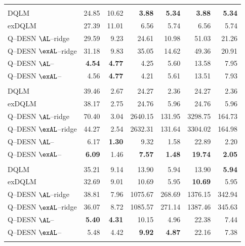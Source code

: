 \begin{longtable}{@{}lrrrrrr@{}}
\addlinespace[0.25em]
\multicolumn{7}{@{}l}{\emph{Laplace errors, $\tau = 0.50$}}\\
DQLM & 24.85 & 10.62 & \textbf{3.88} & \textbf{5.34} & \textbf{3.88} & \textbf{5.34} \\
exDQLM & 27.39 & 11.01 & 6.56 & 5.74 & 6.56 & 5.74 \\
Q--DESN \(\AL\)--ridge & 29.59 & 9.23 & 24.61 & 10.98 & 51.03 & 21.26 \\
Q--DESN \(\exAL\)--ridge & 31.18 & 9.83 & 35.05 & 14.62 & 49.36 & 20.91 \\
Q--DESN \(\AL\)--\RHS{} & \textbf{4.54} & \textbf{4.77} & 4.25 & 5.60 & 13.58 & 7.95 \\
Q--DESN \(\exAL\)--\RHS{} & 4.56 & \textbf{4.77} & 4.21 & 5.61 & 13.51 & 7.93 \\
\addlinespace[0.25em]
\multicolumn{7}{@{}l}{\emph{Gaussian mixture errors, $\tau = 0.05$}}\\
DQLM & 39.46 & 2.67 & 24.27 & 2.36 & 24.27 & 2.36 \\
exDQLM & 38.17 & 2.75 & 24.76 & 5.96 & 24.76 & 5.96 \\
Q--DESN \(\AL\)--ridge & 70.40 & 3.04 & 2640.15 & 131.95 & 3298.75 & 164.73 \\
Q--DESN \(\exAL\)--ridge & 44.27 & 2.54 & 2632.31 & 131.64 & 3304.02 & 164.98 \\
Q--DESN \(\AL\)--\RHS{} & 6.17 & \textbf{1.30} & 9.32 & 1.58 & 22.89 & 2.20 \\
Q--DESN \(\exAL\)--\RHS{} & \textbf{6.09} & 1.46 & \textbf{7.57} & \textbf{1.48} & \textbf{19.74} & \textbf{2.05} \\
\addlinespace[0.25em]
\multicolumn{7}{@{}l}{\emph{Gaussian mixture errors, $\tau = 0.25$}}\\
DQLM & 35.21 & 9.14 & 13.90 & 5.94 & 13.90 & \textbf{5.94} \\
exDQLM & 32.69 & 9.01 & 10.69 & 5.95 & \textbf{10.69} & 5.95 \\
Q--DESN \(\AL\)--ridge & 38.81 & 7.96 & 1075.67 & 268.69 & 1376.15 & 342.94 \\
Q--DESN \(\exAL\)--ridge & 36.07 & 8.72 & 1085.57 & 271.14 & 1387.46 & 345.63 \\
Q--DESN \(\AL\)--\RHS{} & \textbf{5.40} & \textbf{4.31} & 10.15 & 4.96 & 22.38 & 7.44 \\
Q--DESN \(\exAL\)--\RHS{} & 5.48 & 4.42 & \textbf{9.92} & \textbf{4.87} & 22.16 & 7.38 \\
\addlinespace[0.25em]
\multicolumn{7}{@{}l}{\emph{Gaussian mixture errors, $\tau = 0.50$}}\\

\end{longtable}
